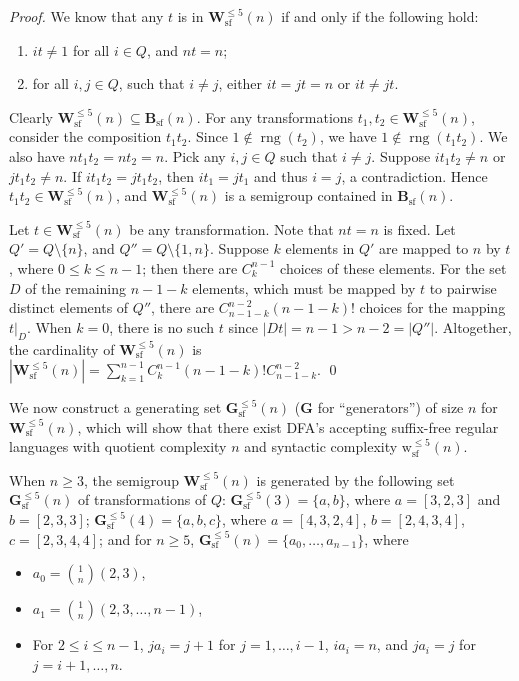 \documentclass{llncs}
\renewcommand{\le}{\leqslant}
\renewcommand{\ge}{\geqslant}
\newcommand{\bi}{\begin{itemize}}
\newcommand{\ei}{\end{itemize}}
\newcommand{\be}{\begin{enumerate}}
\newcommand{\ee}{\end{enumerate}}
\newcommand{\timg}{\mathop{\mbox{rng}}}
\newcommand{\Bsf}{\mathbf{B}_{\mathrm{sf}}}
\newcommand{\Vsf}{\mathbf{W}^{\le 5}_{\mathrm{sf}}}
\newcommand{\Gsf}{\mathbf{G}^{\le 5}_{\mathrm{sf}}}
\newcommand{\vsf}{{\mathrm{w}^{\le 5}_{\mathrm{sf}}}}
\begin{document}
\begin{proof}

We know that any $t$ is in $\Vsf(n)$ if and only if the following hold: 
\be
\item $it \ne 1$ for all $i \in Q$, and $nt = n$; 
\item for all  $i,j \in Q$, such that $i\neq j$,  either $it = jt = n$ or $it \ne jt$. 
\ee

Clearly $\Vsf(n) \subseteq \Bsf(n)$. For any transformations $t_1,t_2 \in \Vsf(n)$, consider the composition $t_1t_2$. Since $1 \not\in \timg(t_2)$, we have $1 \not\in \timg(t_1t_2)$. 
We also have $nt_1t_2 = nt_2 = n$. Pick any $i,j \in Q$ such that $i\neq j$.  
Suppose $it_1t_2 \neq n$ or $jt_1t_2 \neq n$. 
If $it_1t_2 = jt_1t_2$, then $it_1 = jt_1$ and thus $i = j$, a contradiction. Hence $t_1t_2 \in \Vsf(n)$, and $\Vsf(n)$ is a semigroup contained in $\Bsf(n)$. 

Let $t \in \Vsf(n)$ be any transformation. 
Note that $nt = n$ is fixed. 
Let $Q' = Q \setminus \{n\}$, and $Q'' = Q \setminus \{1,n\}$. Suppose $k$ elements in $Q'$ are mapped to $n$ by $t$, where $0 \le k \le n-1$; then there are ${C^{n-1}_k}$ choices of these elements. For the set $D$ of the remaining $n-1-k$ elements, which must be mapped by $t$ to pairwise distinct elements of $Q''$, there are ${C^{n-2}_{n-1-k}}(n-1-k)!$ choices for the mapping $t|_D$. When $k = 0$, there is no such $t$ since $|Dt| = n-1 > n-2 = |Q''|$. 
Altogether, the cardinality of $\Vsf(n)$ is 
  $|\Vsf(n)| = \sum_{k = 1}^{n-1} {C^{n-1}_k}(n-1-k)!{C^{n-2}_{n-1-k}}. $ \qed
\end{proof}


We now construct a generating set $\Gsf(n)$ ($\mathbf{G}$ for ``generators'') of size $n$ for $\Vsf(n)$, which will show that there exist DFA's accepting suffix-free regular languages with quotient complexity $n$ and syntactic complexity $\vsf(n)$.


\begin{proposition}\label{prop:Pgen}
When $n \ge 3$, the semigroup $\Vsf(n)$ is generated by the following set $\Gsf(n)$ of transformations of $Q$:
$\Gsf(3)=\{a,b\}$, where $a=[3,2,3]$ and $b=[2,3,3]$; $\Gsf(4)=\{a,b,c\}$, where $a= [4, 3, 2, 4]$, $b = [2, 4, 3, 4]$, $c = [2, 3, 4, 4]$; and for $n\ge 5$, $\Gsf(n)=\{a_0,\ldots,a_{n-1}\}$, where


\bi
\item $a_0={1 \choose n}(2,3)$,
\item $a_1={1 \choose n}(2,3,\ldots,n-1)$,
\item For $2 \le i \le n - 1$, $ja_i = j+1$ for $j = 1,\ldots,i-1$, $ia_i = n$, and $ja_i = j$ for $j = i+1,\ldots,n$.
\ei

\end{proposition}
\end{document}
